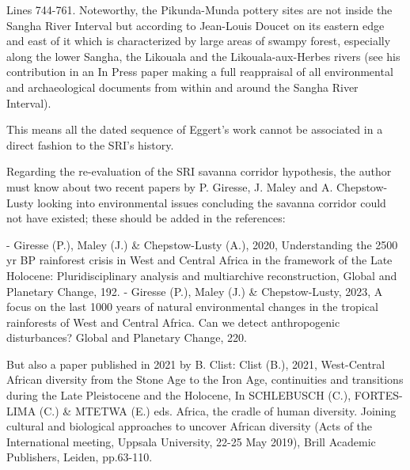 \begin{reviewer}

\point Lines 744-761. Noteworthy, the Pikunda-Munda pottery sites are not inside the Sangha River Interval but according to Jean-Louis Doucet on its eastern edge and east of it which is characterized by large areas of swampy forest, especially along the lower Sangha, the Likouala and the Likouala-aux-Herbes rivers (see his contribution in an In Press paper making a full reappraisal of all environmental and archaeological documents from within and around the Sangha River Interval).

This means all the dated sequence of Eggert's work cannot be associated in a direct fashion to the SRI's history.


\point  Regarding the re-evaluation of the SRI savanna corridor hypothesis, the author must know about two recent papers by P. Giresse, J. Maley and A. Chepstow-Lusty looking into environmental issues concluding the savanna corridor could not have existed; these should be added in the references:

- Giresse (P.), Maley (J.) \& Chepstow-Lusty (A.), 2020, Understanding the 2500 yr BP rainforest crisis in West and Central Africa in the framework of the Late Holocene: Pluridisciplinary analysis and multiarchive reconstruction, Global and Planetary Change, 192.
- Giresse (P.), Maley (J.) \& Chepstow-Lusty, 2023, A focus on the last 1000 years of natural environmental changes in the tropical rainforests of West and Central Africa. Can we detect anthropogenic disturbances? Global and Planetary Change, 220.

But also a paper published in 2021 by B. Clist:
Clist (B.), 2021, West-Central African diversity from the Stone Age to the Iron Age, continuities and transitions during the Late Pleistocene and the Holocene, In SCHLEBUSCH (C.), FORTES-LIMA (C.) \& MTETWA (E.) eds. Africa, the cradle of human diversity. Joining cultural and biological approaches to uncover African diversity (Acts of the International meeting, Uppsala University, 22-25 May 2019), Brill Academic Publishers, Leiden, pp.63-110.


\end{reviewer}

